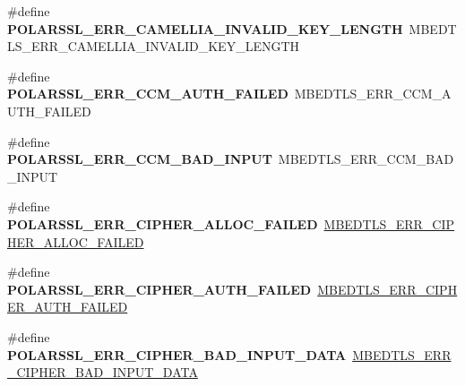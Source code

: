 \begin{DoxyCompactItemize}
\item 
\mbox{\label{compat-1_83_8h_a8bbda0567c613d789430c69ba5069fad}} 
\#define {\bfseries P\+O\+L\+A\+R\+S\+S\+L\+\_\+\+E\+R\+R\+\_\+\+C\+A\+M\+E\+L\+L\+I\+A\+\_\+\+I\+N\+V\+A\+L\+I\+D\+\_\+\+K\+E\+Y\+\_\+\+L\+E\+N\+G\+TH}~M\+B\+E\+D\+T\+L\+S\+\_\+\+E\+R\+R\+\_\+\+C\+A\+M\+E\+L\+L\+I\+A\+\_\+\+I\+N\+V\+A\+L\+I\+D\+\_\+\+K\+E\+Y\+\_\+\+L\+E\+N\+G\+TH
\item 
\mbox{\label{compat-1_83_8h_a51ba7afc7f66aa40e849813869c5d402}} 
\#define {\bfseries P\+O\+L\+A\+R\+S\+S\+L\+\_\+\+E\+R\+R\+\_\+\+C\+C\+M\+\_\+\+A\+U\+T\+H\+\_\+\+F\+A\+I\+L\+ED}~M\+B\+E\+D\+T\+L\+S\+\_\+\+E\+R\+R\+\_\+\+C\+C\+M\+\_\+\+A\+U\+T\+H\+\_\+\+F\+A\+I\+L\+ED
\item 
\mbox{\label{compat-1_83_8h_a511bce4dba4b1934174a199e716ed37d}} 
\#define {\bfseries P\+O\+L\+A\+R\+S\+S\+L\+\_\+\+E\+R\+R\+\_\+\+C\+C\+M\+\_\+\+B\+A\+D\+\_\+\+I\+N\+P\+UT}~M\+B\+E\+D\+T\+L\+S\+\_\+\+E\+R\+R\+\_\+\+C\+C\+M\+\_\+\+B\+A\+D\+\_\+\+I\+N\+P\+UT
\item 
\mbox{\label{compat-1_83_8h_ab4d8385421d4fb4a71f2a00734487688}} 
\#define {\bfseries P\+O\+L\+A\+R\+S\+S\+L\+\_\+\+E\+R\+R\+\_\+\+C\+I\+P\+H\+E\+R\+\_\+\+A\+L\+L\+O\+C\+\_\+\+F\+A\+I\+L\+ED}~\mbox{\hyperlink{cipher_8h_abd30fe33f8b6cf8106e7ea29d3f795cd}{M\+B\+E\+D\+T\+L\+S\+\_\+\+E\+R\+R\+\_\+\+C\+I\+P\+H\+E\+R\+\_\+\+A\+L\+L\+O\+C\+\_\+\+F\+A\+I\+L\+ED}}
\item 
\mbox{\label{compat-1_83_8h_a0ed0acc64ce4edbb029dd1d7fd1c8710}} 
\#define {\bfseries P\+O\+L\+A\+R\+S\+S\+L\+\_\+\+E\+R\+R\+\_\+\+C\+I\+P\+H\+E\+R\+\_\+\+A\+U\+T\+H\+\_\+\+F\+A\+I\+L\+ED}~\mbox{\hyperlink{cipher_8h_a67ec20c7b124cb258978a41d5c363def}{M\+B\+E\+D\+T\+L\+S\+\_\+\+E\+R\+R\+\_\+\+C\+I\+P\+H\+E\+R\+\_\+\+A\+U\+T\+H\+\_\+\+F\+A\+I\+L\+ED}}
\item 
\mbox{\label{compat-1_83_8h_a7078656ad138756ee9991f15d529d3bb}} 
\#define {\bfseries P\+O\+L\+A\+R\+S\+S\+L\+\_\+\+E\+R\+R\+\_\+\+C\+I\+P\+H\+E\+R\+\_\+\+B\+A\+D\+\_\+\+I\+N\+P\+U\+T\+\_\+\+D\+A\+TA}~\mbox{\hyperlink{cipher_8h_a6ce4034c4ecd0cd1592232ed8a93d648}{M\+B\+E\+D\+T\+L\+S\+\_\+\+E\+R\+R\+\_\+\+C\+I\+P\+H\+E\+R\+\_\+\+B\+A\+D\+\_\+\+I\+N\+P\+U\+T\+\_\+\+D\+A\+TA}}

\end{DoxyCompactItemize}
